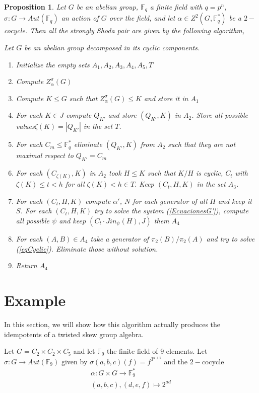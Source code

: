 \documentclass{article}
\newtheorem{proposition}[theorem]{Proposition}
\begin{document}
\begin{proposition}
    Let $G$ be an abelian group, $\mathbb{F}_q$ a finite field with $q=p^n$, $\sigma : G \longrightarrow Aut(\mathbb{F}_q)$ an action of $G$ over the field, and let  $\alpha\in Z^2(G,\mathbb{F}_q^*)$ be a $2-$cocycle. Then all the strongly Shoda pair are given by the following algorithm,
     \begin{algorithm}[H]
Let $G$ be an abelian group decomposed in its cyclic components.
    \begin{enumerate}
        \item Initialize the empty sets $A_1, A_2, A_3,A_4,A_5,T$
        \item Compute $Z_\alpha^\sigma(G)$
        \item Compute $K\leq G$ such that $Z_\alpha^\sigma(G) \leq K$ and store it in $A_1$
        \item For each $K\in J$ compute $Q_{K'}$ and store $(Q_{K'},K)$ in $A_2$. Store all possible values$\zeta(K)=|Q_{K'}|$ in the set $T$.
        \item For each $C_m \leq \mathbb{F}_q^*$ eliminate $(Q_{K'},K)$ from $A_2$ such that they are not maximal respect to $Q_{K'}=C_m$ 
        \item For each $(C_{\zeta(K)},K)$ in $A_2$ took $H\leq K$ such that $K/H$ is cyclic, $C_t$ with $\zeta(K)\leq t < h$ for all $\zeta(K)<h \in T$. Keep $(C_t, H, K)$ in the set $A_3$.
        \item For each $(C_t,H,K)$ compute $\alpha'$, $N$ for each generator of all $H$ and keep it $S$.  For each  $(C_t,H,K)$ try to solve the system (\ref{EcuacionesG'}), compute all possible $\psi$ and keep $(C_t\cdot Jin_\psi(H),J)$ them $A_4$
        \item For each $(A,B)\in A_4$ take a generator of $\pi_2(B)/ \pi_2(A)$ and try to solve (\ref{eqCyclic}). Eliminate those without solution. 
        \item Return $A_4$
    \end{enumerate}
\end{algorithm}
\end{proposition}

\section{Example}
In this section, we will show how this algorithm actually produces the idempotents of a twisted skew group algebra. 

Let $G=C_2 \times C_2 \times C_5$ and let $\mathbb{F}_9$ the finite field of $9$ elements. Let $\sigma: G \longrightarrow Aut(\mathbb{F}_9)$ given by $\sigma(a,b,c) (f) = f^{3^{a+b}}$ and the $2-$cocycle
\begin{align*}
    \alpha: G \times G \longrightarrow \mathbb{F}_{9}^* \\
    (a,b,c) , (d,e,f) \longmapsto 2^{ad}
\end{align*}
\end{document}
